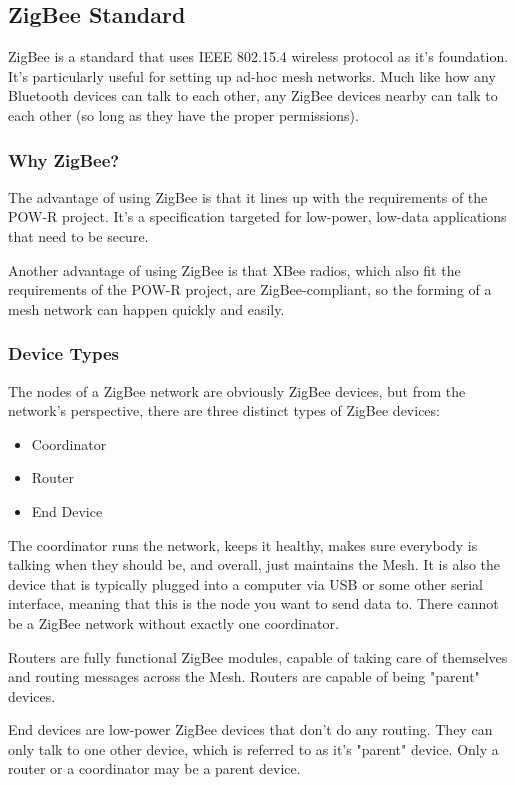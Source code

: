 
\subsection{ZigBee Standard}
ZigBee is a standard that uses IEEE 802.15.4 wireless protocol as it's foundation. It's 
particularly useful for setting up ad-hoc mesh networks. Much like how any Bluetooth
devices can talk to each other, any ZigBee devices nearby can talk to each other (so 
long as they have the proper permissions).

\subsubsection{Why ZigBee?}
The advantage of using ZigBee is that it lines up with the requirements of the POW-R
project. It's a specification targeted for low-power, low-data applications that need
to be secure. 

Another advantage of using ZigBee is that XBee radios, which also fit the requirements
of the POW-R project, are ZigBee-compliant, so the forming of a mesh network can happen
quickly and easily.

\subsubsection{Device Types}
The nodes of a ZigBee network are obviously ZigBee devices, but from the network's
perspective, there are three distinct types of ZigBee devices:

\begin{itemize}
	\item Coordinator
	\item Router
	\item End Device
\end{itemize}

The coordinator runs the network, keeps it healthy, makes sure everybody is talking when
they should be, and overall, just maintains the Mesh. It is also the device that is 
typically plugged into a computer via USB or some other serial interface, meaning
that this is the node you want to send data to. There cannot be a ZigBee network
without exactly one coordinator.

Routers are fully functional ZigBee modules, capable of taking care of themselves and
routing messages across the Mesh. Routers are capable of being "parent" devices.

End devices are low-power ZigBee devices that don't do any routing. They can only talk
to one other device, which is referred to as it's "parent" device. Only a router or a coordinator
may be a parent device.

